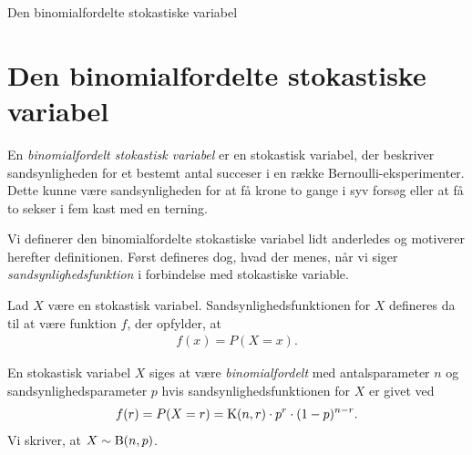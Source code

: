 \begin{center}
\Huge
Den binomialfordelte stokastiske variabel
\end{center}
\section*{Den binomialfordelte stokastiske variabel}

En \textit{binomialfordelt stokastisk variabel} er en stokastisk variabel, der beskriver sandsynligheden for et bestemt antal succeser i en række Bernoulli-eksperimenter. Dette kunne være sandsynligheden for at få krone to gange i syv forsøg eller at få to sekser i fem kast med en terning. 

Vi definerer den binomialfordelte stokastiske variabel lidt anderledes og motiverer herefter definitionen. Først defineres dog, hvad der menes, når vi siger \textit{sandsynlighedsfunktion} i forbindelse med stokastiske variable. 
\begin{defn}[Sandsynlighedsfunktion]
	Lad $X$ være en stokastisk variabel. Sandsynlighedsfunktionen for $X$ defineres da til at være funktion $f$, der opfylder,  at
	\begin{align*}
		f(x) = P(X = x).
	\end{align*}
\end{defn}
\begin{defn}
	\label{def:bin}
	En stokastisk variabel $X$ siges at være \textit{binomialfordelt} med antalsparameter $n$ og sandsynlighedsparameter $p$ hvis sandsynlighedsfunktionen for $X$ er givet ved
	\begin{align*}
		f(r) = P(X = r) = \textnormal{K}(n,r)\cdot p^r\cdot (1-p)^{n-r}.
	\end{align*}
	Vi skriver, at $X \sim \textnormal{B}(n,p)$. 
\end{defn}

